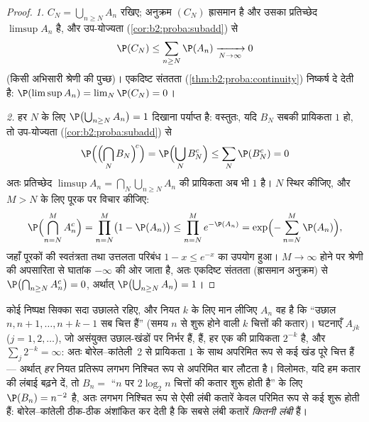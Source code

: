 \begin{proof}
\emph{1.} $C_N = \bigcup_{n \geq N}A_n$ रखिए; अनुक्रम $(C_N)$ ह्रासमान है और उसका प्रतिच्छेद $\limsup A_n$
है, और  उप-योज्यता (\cref{cor:b2:proba:subadd}) से
\[
\P(C_N) \leq \sum_{n \geq N}\P(A_n)
\xrightarrow[N\to\infty]{} 0
\]
(किसी अभिसारी श्रेणी की पुच्छ)। एकदिष्ट संततता (\cref{thm:b2:proba:continuity}) निष्कर्ष दे
देती है: $\P(\limsup A_n) =
\lim_N \P(C_N) = 0$।

\emph{2.} हर $N$ के लिए $\P\bigl(\bigcup_{n\geq N}A_n\bigr)
= 1$ दिखाना पर्याप्त है: वस्तुतः, यदि
 $B_N$ सबकी प्रायिकता $1$ हो, तो  उप-योज्यता (\cref{cor:b2:proba:subadd}) से
\[
\P\Bigl(\Bigl(\bigcap_NB_N\Bigr)^{\!c}\Bigr)
= \P\Bigl(\bigcup_NB_N^c\Bigr)
\leq \sum_N\P(B_N^c) = 0
\]
अतः  प्रतिच्छेद $\limsup A_n = \bigcap_N\bigcup_{n\geq N}A_n$ की प्रायिकता अब भी $1$ है। $N$ स्थिर
कीजिए, और $M > N$ के लिए पूरक पर विचार कीजिए:
\[
\P\Bigl(\bigcap_{n=N}^{M} A_n^c\Bigr)
= \prod_{n=N}^{M}\bigl(1 - \P(A_n)\bigr)
\leq \prod_{n=N}^{M} e^{-\P(A_n)}
= \exp\Bigl(-\sum_{n=N}^M \P(A_n)\Bigr) ,
\]
जहाँ पूरकों की स्वतंत्रता तथा उत्तलता परिबंध $1 -
x \leq e^{-x}$ का उपयोग हुआ।
$M \to \infty$ होने पर श्रेणी की अपसारिता से घातांक $-\infty$ की ओर जाता है, अतः
एकदिष्ट संततता (ह्रासमान अनुक्रम) से $\P\bigl(\bigcap_{n \geq N}A_n^c\bigr) = 0$, अर्थात् $\P\bigl(\bigcup_{n \geq N}A_n\bigr) = 1$।
\end{proof}

\begin{example}[चित्तों की अपरिमित कतारें]\label{ex:b2:proba:runs}
कोई निष्पक्ष सिक्का सदा उछालते रहिए, और नियत $k$ के लिए मान लीजिए
$A_n$ वह  है कि ``उछाल $n,
n+1, \dots, n + k - 1$ सब चित्त हैं'' (समय $n$ से शुरू होने
वाली $k$ चित्तों की कतार)। घटनाएँ $A_{jk}$ ($j =
1, 2, \dots$), जो असंयुक्त
उछाल-खंडों पर निर्भर हैं,  हैं, हर एक की प्रायिकता $2^{-k}$ है,
और $\sum_j 2^{-k} =
\infty$: अतः बोरेल--कांतेली~2 से प्रायिकता $1$ के साथ अपरिमित रूप
से कई खंड पूरे चित्त हैं --- अर्थात् \emph{हर} नियत प्रतिरूप लगभग
निश्चित रूप से अपरिमित बार लौटता है। विलोमतः, यदि हम कतार की लंबाई
बढ़ने दें, तो $B_n = {}$ ``$n$ पर $2\log_2 n$ चित्तों की कतार शुरू होती है''
के लिए $\P(B_n) = n^{-2}$  है, अतः लगभग निश्चित रूप से ऐसी लंबी कतारें केवल
परिमित रूप से कई शुरू होती हैं: बोरेल--कांतेली ठीक-ठीक अंशांकित कर
देती है कि सबसे लंबी कतारें \emph{कितनी लंबी} हैं।
\end{example}

